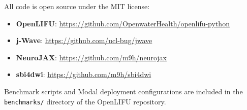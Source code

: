 \documentclass[11pt,a4paper]{article}\usepackage[]{graphicx}\usepackage[]{xcolor}
\begin{document}
All code is open source under the MIT license:
\begin{itemize}
  \item \textbf{OpenLIFU}: \url{https://github.com/OpenwaterHealth/openlifu-python}
  \item \textbf{j-Wave}: \url{https://github.com/ucl-bug/jwave}
  \item \textbf{NeuroJAX}: \url{https://github.com/m9h/neurojax}
  \item \textbf{sbi4dwi}: \url{https://github.com/m9h/sbi4dwi}
\end{itemize}

Benchmark scripts and Modal deployment configurations are included in
the \texttt{benchmarks/} directory of the OpenLIFU repository.


\end{document}
